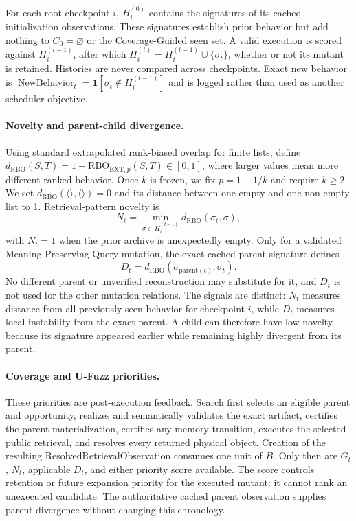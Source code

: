For each root checkpoint \(i\), \(H_i^{(0)}\) contains the signatures of its
cached initialization observations. These signatures establish prior behavior
but add nothing to \(C_0=\varnothing\) or the Coverage-Guided seen set. A valid
execution is scored against \(H_i^{(t-1)}\), after which
\(H_i^{(t)}=H_i^{(t-1)}\cup\{\sigma_t\}\), whether or not its mutant is
retained. Histories are never compared across checkpoints. Exact new behavior
is
\(\operatorname{NewBehavior}_t=
\mathbf{1}[\sigma_t\notin H_i^{(t-1)}]\) and is logged rather than used as
another scheduler objective.

\paragraph{Novelty and parent-child divergence.}
Using standard extrapolated rank-biased overlap for finite lists, define
\(d_{\mathrm{RBO}}(S,T)=1-\mathrm{RBO}_{\mathrm{EXT},p}(S,T)\in[0,1]\),
where larger values mean more different ranked behavior. Once \(k\) is frozen,
we fix \(p=1-1/k\) and require \(k\geq2\). We set
\(d_{\mathrm{RBO}}(\langle\rangle,\langle\rangle)=0\) and its distance
between one empty and one non-empty list to 1. Retrieval-pattern novelty is
\begin{equation}
N_t=\min_{\sigma\in H_i^{(t-1)}}
d_{\mathrm{RBO}}(\sigma_t,\sigma),
\label{eq:retrieval-novelty}
\end{equation}
with \(N_t=1\) when the prior archive is unexpectedly empty. Only for a
validated Meaning-Preserving Query mutation, the exact cached parent signature
defines
\begin{equation}
D_t=d_{\mathrm{RBO}}(\sigma_{\mathrm{parent}(t)},\sigma_t).
\label{eq:retrieval-divergence}
\end{equation}
No different parent or unverified reconstruction may substitute for it, and
\(D_t\) is not used for the other mutation relations. The signals are distinct:
\(N_t\) measures distance from all previously seen behavior for checkpoint
\(i\), while \(D_t\) measures local instability from the exact parent. A child
can therefore have low novelty because its signature appeared earlier while
remaining highly divergent from its parent.

\paragraph{Coverage and U-Fuzz priorities.}
These priorities are post-execution feedback. Search first selects an eligible
parent and opportunity, realizes and semantically validates the exact artifact,
certifies the parent materialization, certifies any memory transition, executes
the selected public retrieval, and resolves every returned physical object.
Creation of the resulting ResolvedRetrievalObservation consumes one unit of
\(B\). Only then are \(G_t\), \(N_t\), applicable \(D_t\), and either priority
score available. The score controls retention or future expansion priority for
the executed mutant; it cannot rank an unexecuted candidate. The authoritative
cached parent observation supplies parent divergence without changing this
chronology.

